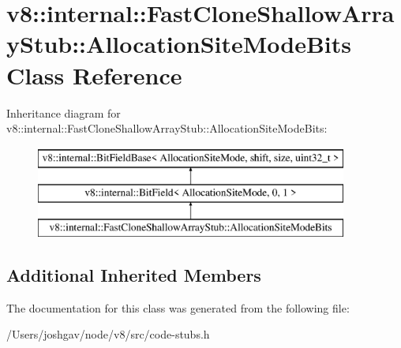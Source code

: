 \hypertarget{classv8_1_1internal_1_1_fast_clone_shallow_array_stub_1_1_allocation_site_mode_bits}{}\section{v8\+:\+:internal\+:\+:Fast\+Clone\+Shallow\+Array\+Stub\+:\+:Allocation\+Site\+Mode\+Bits Class Reference}
\label{classv8_1_1internal_1_1_fast_clone_shallow_array_stub_1_1_allocation_site_mode_bits}
Inheritance diagram for v8\+:\+:internal\+:\+:Fast\+Clone\+Shallow\+Array\+Stub\+:\+:Allocation\+Site\+Mode\+Bits\+:\begin{figure}[H]
\begin{center}
\leavevmode
\includegraphics[height=3.000000cm]{classv8_1_1internal_1_1_fast_clone_shallow_array_stub_1_1_allocation_site_mode_bits}
\end{center}
\end{figure}
\subsection*{Additional Inherited Members}


The documentation for this class was generated from the following file\+:\begin{DoxyCompactItemize}
\item 
/\+Users/joshgav/node/v8/src/code-\/stubs.\+h\end{DoxyCompactItemize}
